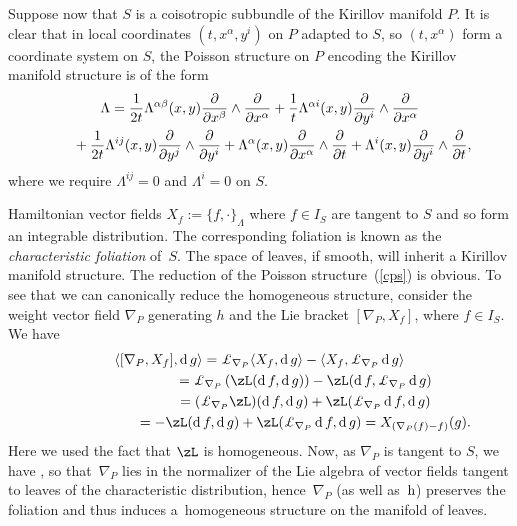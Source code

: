 \documentclass[pdftex]{sigma}
\newcommand{\rmh}{\textnormal{h}}
\newcommand{\Ll}{{\pounds}}
\def\lan{\langle}
\def\ran{\rangle}
\def\xd{\operatorname{d}}
\numberwithin{equation}{section}
\begin{document}
Suppose now that $S$ is a coisotropic subbundle of the Kirillov manifold $P$. It is clear that in local coordinates $(t, x^{\alpha}, y^{i})$ on $P$ adapted to $S$, so $(t, x^{\alpha})$ form a coordinate system on $S$, the Poisson structure on $P$ encoding the Kirillov manifold structure is of the form
\begin{gather}
\Lambda = \frac{1}{2t} \Lambda^{\alpha \beta}(x,y)\frac{\partial}{\partial x^{\beta}} \wedge\frac{\partial}{\partial x^{\alpha}} + \frac{1}{t}\Lambda^{\alpha i}(x,y)\frac{\partial}{\partial y^{i}} \wedge \frac{\partial}{\partial x^{\alpha}}\nonumber\\
\hphantom{\Lambda =}{} + \frac{1}{2t} \Lambda^{ij}(x,y)\frac{\partial}{\partial y^{j}} \wedge\frac{\partial}{\partial y^{i}} + \Lambda^{\alpha}(x,y)\frac{\partial}{\partial x^{\alpha}} \wedge\frac{\partial}{\partial t} + \Lambda^{i}(x,y)\frac{\partial}{\partial y^{i}} \wedge\frac{\partial}{\partial t}, \label{cps}
\end{gather}
where we require $\Lambda^{ij}=0$ and $\Lambda^{i}=0$ on $S$.

Hamiltonian vector f\/ields $X_{f} := \{ f, \cdot\}_{\Lambda}$ where $f \in I_{S}$ are tangent to $S$ and so form an integrable distribution. The corresponding foliation is known as the \emph{characteristic foliation} of~$S$. The space of leaves, if smooth, will inherit a Kirillov manifold structure. The reduction of the Poisson structure~(\ref{cps}) is obvious. To see that we can canonically reduce the homogeneous structure, consider the weight vector f\/ield $\nabla_P$ generating $h$ and the Lie bracket $[\nabla_P,X_f]$, where $f\in I_S$. We have
\begin{gather*} \lan[\nabla_P,X_f],\xd g\ran= \Ll_{\nabla_P}\lan {X_f},{\xd g}\ran-\lan X_f,\Ll_{\nabla_P}\xd g\ran\\
\hphantom{\lan[\nabla_P,X_f],\xd g\ran}{} = \Ll_{\nabla_P}\left(\zL(\xd f,\xd g)\right)-\zL(\xd f,\Ll_{\nabla_P}\xd g)\\
\hphantom{\lan[\nabla_P,X_f],\xd g\ran}{} = (\Ll_{\nabla_P}\zL)(\xd f,\xd g) +\zL(\Ll_{\nabla_P}\xd f,\xd g)\\
\hphantom{\lan[\nabla_P,X_f],\xd g\ran}{} = -\zL(\xd f,\xd g)+\zL(\Ll_{\nabla_P}\xd f,\xd g)=X_{(\nabla_P(f)-f)}(g).
\end{gather*}
Here we used the fact that $\zL$ is homogeneous. Now, as $\nabla_P$ is tangent to $S$, we have , so that~$\nabla_P$ lies in the normalizer of the Lie algebra of vector f\/ields tangent to leaves of the characteristic distribution, hence~$\nabla_P$ (as well as~$\rmh$) preserves the foliation and thus induces a~homogeneous structure on the manifold of leaves.
\end{document}
